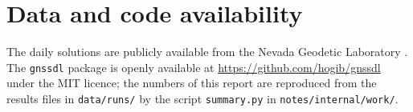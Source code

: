 \documentclass[preprint,12pt,authoryear]{elsarticle}
\begin{document}
\section*{Data and code availability}

The daily solutions are publicly available from the Nevada Geodetic Laboratory \citep{ngl2026}. The \texttt{gnssdl} package is openly available at \url{https://github.com/hogib/gnssdl} under the MIT licence; the numbers of this report are reproduced from the results files in \texttt{data/runs/} by the script \texttt{summary.py} in \texttt{notes/internal/work/}.



\end{document}
